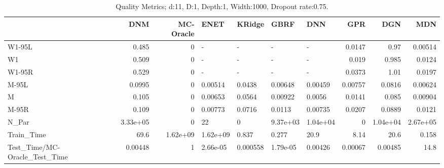\begin{table}
\centering
\caption{Quality Metrics; d:11, D:1, Depth:1, Width:1000, Dropout rate:0.75.}
\begin{tabular}{lrrllllrrr}
\toprule
{} &      DNM &  MC-Oracle &     ENET &   KRidge &     GBRF &      DNN &     GPR &      DGN &      MDN \\
\midrule
W1-95L                        &    0.485 &          0 &        - &        - &        - &        - &  0.0147 &     0.97 &  0.00514 \\
W1                            &    0.509 &          0 &        - &        - &        - &        - &   0.019 &    0.985 &   0.0124 \\
W1-95R                        &    0.529 &          0 &        - &        - &        - &        - &  0.0373 &     1.01 &   0.0197 \\
M-95L                         &   0.0995 &          0 &  0.00514 &   0.0438 &  0.00648 &  0.00459 & 0.00757 &   0.0816 &  0.00624 \\
M                             &    0.105 &          0 &  0.00653 &   0.0564 &  0.00922 &   0.0056 &  0.0141 &    0.085 &  0.00904 \\
M-95R                         &    0.109 &          0 &  0.00773 &   0.0716 &   0.0113 &  0.00735 &  0.0207 &   0.0889 &   0.0121 \\
N\_Par                         & 3.33e+05 &          0 &       22 &        0 & 9.37e+03 & 1.04e+04 &       0 & 1.04e+04 & 2.67e+05 \\
Train\_Time                    &     69.6 &   1.62e+09 & 1.62e+09 &    0.837 &    0.277 &     20.9 &    8.14 &     20.6 &    0.158 \\
Test\_Time/MC-Oracle\_Test\_Time &  0.00448 &          1 & 2.66e-05 & 0.000558 & 1.79e-05 &  0.00426 & 0.00067 &  0.00485 &     14.8 \\
\bottomrule
\end{tabular}
\end{table}
